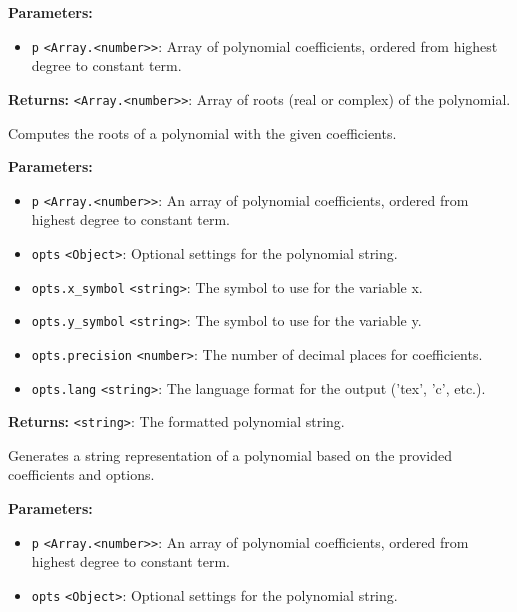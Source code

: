 \documentclass[12pt,a4paper]{article}
\begin{document}
\noindent \textbf{Parameters:}
\begin{itemize}
  \item \texttt{p} \texttt{<Array.<number>>}: Array of polynomial coefficients, ordered from highest degree to constant term.
\end{itemize}

\noindent \textbf{Returns:} \texttt{<Array.<number>>}: Array of roots (real or complex) of the polynomial.

\noindent Computes the roots of a polynomial with the given coefficients.

\vspace{5mm}
\noindent {}


\noindent \textbf{Parameters:}
\begin{itemize}
  \item \texttt{p} \texttt{<Array.<number>>}: An array of polynomial coefficients, ordered from highest degree to constant term.
  \item \texttt{opts} \texttt{<Object>}: Optional settings for the polynomial string.
  \item \texttt{opts.x\_symbol} \texttt{<string>}: The symbol to use for the variable x.
  \item \texttt{opts.y\_symbol} \texttt{<string>}: The symbol to use for the variable y.
  \item \texttt{opts.precision} \texttt{<number>}: The number of decimal places for coefficients.
  \item \texttt{opts.lang} \texttt{<string>}: The language format for the output ('tex', 'c', etc.).
\end{itemize}

\noindent \textbf{Returns:} \texttt{<string>}: The formatted polynomial string.

\noindent Generates a string representation of a polynomial based on the provided coefficients and options.

\vspace{5mm}
\noindent {}


\noindent \textbf{Parameters:}
\begin{itemize}
  \item \texttt{p} \texttt{<Array.<number>>}: An array of polynomial coefficients, ordered from highest degree to constant term.
  \item \texttt{opts} \texttt{<Object>}: Optional settings for the polynomial string.
\end{itemize}
\end{document}
